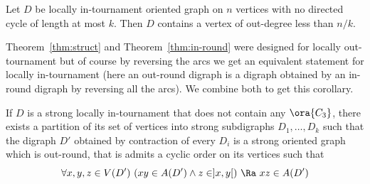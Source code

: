\begin{theorem}\label{thm:CH}
Let $D$ be locally in-tournament oriented graph on $n$ vertices with no directed cycle of length at most $k$. Then $D$ contains a vertex of out-degree less than $n/k$.
\end{theorem}


Theorem~\ref{thm:struct} and Theorem~\ref{thm:in-round} were designed for locally out-tournament but of course by reversing the arcs we get an equivalent statement for locally in-tournament (here an out-round digraph is a digraph obtained by an in-round digraph by reversing all the arcs). We combine both to get this corollary.

\begin{corollary}\label{cor:locain}
If $D$ is a  
strong locally in-tournament that does not contain any $\ora{C_3}$, 
there exists a partition of its set of vertices into strong subdigraphs $D_{1},\ldots,D_{k}$ such that the digraph $D'$ obtained by contraction of every $D_{i}$ is a strong oriented graph which is out-round, that is admits a cyclic order on its vertices such that 
$$\forall x,y,z\in V(D')\  (xy\in A(D') \land  z\in ]x,y[  )\ \Ra\ xz\in A(D')
$$
\end{corollary}


